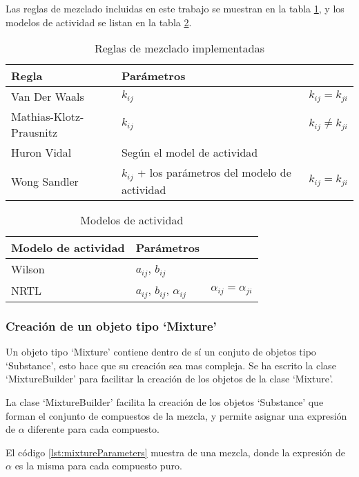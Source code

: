 Las reglas de mezclado incluidas en este trabajo se muestran en la tabla \ref{tab:mixingrules}, y los modelos de actividad se listan en la tabla \ref{tab:activitymodels}.

\begin{table}[!h]
	\caption{Reglas de mezclado implementadas}\label{tab:mixingrules}
	\begin{tabularx}{\textwidth}{|X|X|X|}
		\hline
		Regla & Parámetros & \\
		\hline
		Van Der Waals & $k_{ij}$ & $k_{ij} = k_{ji}$ \\
		Mathias-Klotz-Prausnitz& $k_{ij}$ & $k_{ij} \neq k_{ji}$ \\
		Huron Vidal & Según el model de actividad & \\
		Wong Sandler & $k_{ij}$ + los parámetros del modelo de actividad & $k_{ij} = k_{ji}$ \\
		\hline
	\end{tabularx}
\end{table}

\begin{table}[!h]
	\caption{Modelos de actividad }\label{tab:activitymodels}
	\begin{tabularx}{\textwidth}{|X|X|X|}
		\hline
		Modelo de actividad & Parámetros & \\
		\hline
		Wilson & $a_{ij}$, $b_{ij}$  & \\
		NRTL & $a_{ij}$, $b_{ij}$, $\alpha_{ij}$ & $\alpha_{ij} = \alpha_{ji}$ \\
		\hline
	\end{tabularx}
\end{table}
\subsubsection{Creación de un objeto tipo `Mixture'}\label{subsub:mixtureCreation}

Un objeto tipo `Mixture' contiene dentro de sí un conjuto de objetos tipo `Substance', esto hace que su creación sea mas compleja. Se ha escrito la clase `MixtureBuilder' para facilitar la creación de los objetos de la clase `Mixture'.

La clase `MixtureBuilder' facilita la creación de los objetos `Substance' que forman el conjunto de compuestos de la mezcla, y permite asignar una expresión de $\alpha$ diferente para cada compuesto.

El código \ref{lst:mixtureParameters} muestra de una mezcla, donde la expresión de $\alpha$ es la misma para cada compuesto puro. 

